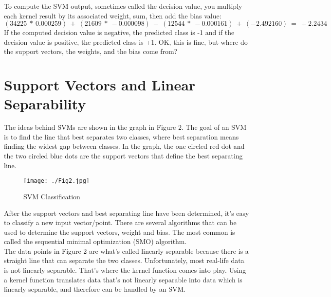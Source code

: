 \documentclass[13pt]{article}
\begin{document}
\noindent
To compute the SVM output, sometimes called the decision value, you multiply each kernel result by its associated weight, sum, then add the bias value:\\

\noindent
$(34225\ *\ 0.000259)\ +\ (21609\ *\ -0.000098)\ +\ (12544\ *\ -0.000161)\ +\ (-2.492160)\ =\ +2.2434$\\

\noindent
If the computed decision value is negative, the predicted class is -1 and if the decision value is positive, the predicted class is +1. OK, this is fine, but where do the support vectors, the weights, and the bias come from?

\section{Support Vectors and Linear Separability}

The ideas behind SVMs are shown in the graph in Figure 2. The goal of an SVM is to find the line that best separates two classes, where best separation means finding the widest gap between classes. In the graph, the one circled red dot and the two circled blue dots are the support vectors that define the best separating line.\\


\begin{figure}
\texttt{[image: ./Fig2.jpg]}
\caption{SVM Classification}
\end{figure}

\noindent
After the support vectors and best separating line have been determined, it's easy to classify a new input vector/point. There are several algorithms that can be used to determine the support vectors, weight and bias. The most common is called the sequential minimal optimization (SMO) algorithm.\\

\noindent
The data points in Figure 2 are what's called linearly separable because there is a straight line that can separate the two classes. Unfortunately, most real-life data is not linearly separable. That's where the kernel function comes into play. Using a kernel function translates data that's not linearly separable into data which is linearly separable, and therefore can be handled by an SVM.
\end{document}
